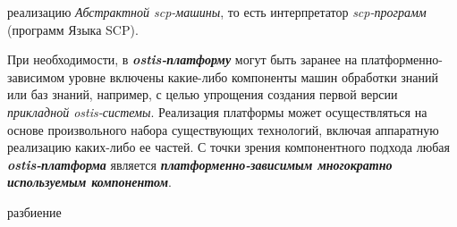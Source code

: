 \begin{SCn}
\begin{scnsubstruct}
{\begin{scnitemize}
			\item реализацию \textit{Абстрактной scp-машины}, то есть интерпретатор \textit{scp-программ} (программ Языка SCP).
		\end{scnitemize}
		При необходимости, в \textbf{\textit{ostis-платформу}} могут быть заранее на платформенно-зависимом уровне включены какие-либо компоненты машин обработки знаний или баз знаний, например, с целью упрощения создания первой версии \textit{прикладной ostis-системы}. Реализация платформы может осуществляться на основе произвольного набора существующих технологий, включая аппаратную реализацию каких-либо ее частей. С точки зрения компонентного подхода любая \textbf{\textit{ostis-платформа}} является \textbf{\textit{платформенно-зависимым многократно используемым компонентом}}.}
	\begin{scnrelfromset}{разбиение}
	\end{scnrelfromset}
	

\end{scnsubstruct}
\end{SCn}
